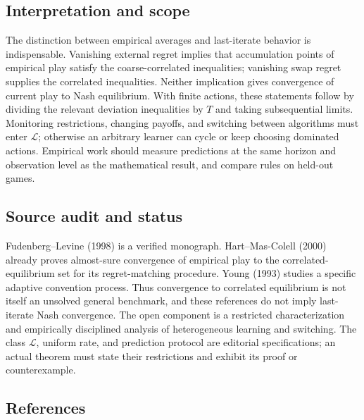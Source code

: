 \documentclass[11pt,a4paper]{article}
\begin{document}
\subsection*{Interpretation and scope}

The distinction between empirical averages and last-iterate behavior is indispensable. Vanishing external regret implies that accumulation points of empirical play satisfy the coarse-correlated inequalities; vanishing swap regret supplies the correlated inequalities. Neither implication gives convergence of current play to Nash equilibrium. With finite actions, these statements follow by dividing the relevant deviation inequalities by $T$ and taking subsequential limits. Monitoring restrictions, changing payoffs, and switching between algorithms must enter $\mathcal L$; otherwise an arbitrary learner can cycle or keep choosing dominated actions. Empirical work should measure predictions at the same horizon and observation level as the mathematical result, and compare rules on held-out games.

\subsection*{Source audit and status}

Fudenberg--Levine (1998) is a verified monograph. Hart--Mas-Colell (2000) already proves almost-sure convergence of empirical play to the correlated-equilibrium set for its regret-matching procedure. Young (1993) studies a specific adaptive convention process. Thus convergence to correlated equilibrium is not itself an unsolved general benchmark, and these references do not imply last-iterate Nash convergence. The open component is a restricted characterization and empirically disciplined analysis of heterogeneous learning and switching. The class $\mathcal L$, uniform rate, and prediction protocol are editorial specifications; an actual theorem must state their restrictions and exhibit its proof or counterexample.

\subsection*{References}
\end{document}
